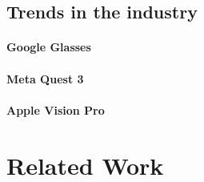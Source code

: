 \subsection{Trends in the industry}

\paragraph{Google Glasses}

\paragraph{Meta Quest 3}

\paragraph{Apple Vision Pro}

\section{Related Work}
